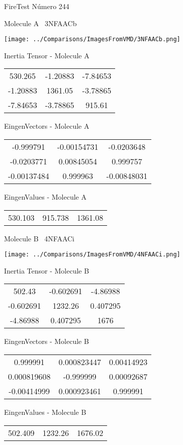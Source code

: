 \vtab[-3cm]
\begin{center}
{\large FireTest \tab Número 244}
\end{center}
\begin{multicols}{2}
\begin{center}

Molecule A \
3NFAACb

\texttt{[image: ../Comparisons/ImagesFromVMD/3NFAACb.png]}

Inertia Tensor - Molecule A \\
\begin{tabular}{|c c c|}
530.265	 & 	-1.20883	 & 	-7.84653	 \\
-1.20883	 & 	1361.05	 & 	-3.78865	 \\
-7.84653	 & 	-3.78865	 & 	915.61
\end{tabular}

\vtab
 EingenVectors - Molecule A     \\
\begin{tabular}{|c c c|}
-0.999791	 & 	-0.00154731	 & 	-0.0203648	 \\
-0.0203771	 & 	0.00845054	 & 	0.999757	 \\
-0.00137484	 & 	0.999963	 & 	-0.00848031
\end{tabular}

\vtab
 EingenValues - Molecule A     \\
\begin{tabular}{|c c c|}
530.103	 & 	915.738	 & 	1361.08	 \\
\end{tabular}
\columnbreak

Molecule B \
4NFAACi

\texttt{[image: ../Comparisons/ImagesFromVMD/4NFAACi.png]}

Inertia Tensor - Molecule B \\
\begin{tabular}{|c c c|}
502.43	 & 	-0.602691	 & 	-4.86988	 \\
-0.602691	 & 	1232.26	 & 	0.407295	 \\
-4.86988	 & 	0.407295	 & 	1676
\end{tabular}

\vtab
 EingenVectors - Molecule B     \\
\begin{tabular}{|c c c|}
0.999991	 & 	0.000823447	 & 	0.00414923	 \\
0.000819608	 & 	-0.999999	 & 	0.00092687	 \\
-0.00414999	 & 	0.000923461	 & 	0.999991
\end{tabular}

\vtab
 EingenValues - Molecule B     \\
\begin{tabular}{|c c c|}
502.409	 & 	1232.26	 & 	1676.02	 \\
\end{tabular}

\end{center}
\end{multicols}

